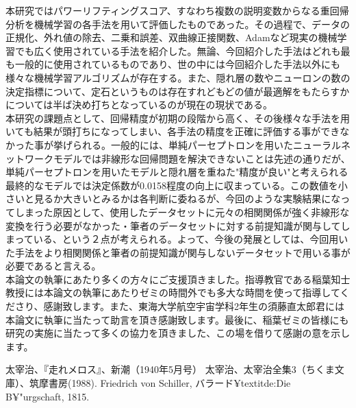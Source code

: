 \documentclass{report}
\begin{document}
本研究ではパワーリフティングスコア、すなわち複数の説明変数からなる重回帰分析を機械学習の各手法を用いて評価したものであった。その過程で、データの正規化、外れ値の除去、二乗和誤差、双曲線正接関数、Adamなど現実の機械学習でも広く使用されている手法を紹介した。無論、今回紹介した手法はどれも最も一般的に使用されているものであり、世の中には今回紹介した手法以外にも様々な機械学習アルゴリズムが存在する。また、隠れ層の数やニューロンの数の決定指標について、定石というものは存在すれどもどの値が最適解をもたらすかについては半ば決め打ちとなっているのが現在の現状である。
\\

本研究の課題点として、回帰精度が初期の段階から高く、その後様々な手法を用いても結果が頭打ちになってしまい、各手法の精度を正確に評価する事ができなかった事が挙げられる。一般的には、単純パーセプトロンを用いたニューラルネットワークモデルでは非線形な回帰問題を解決できないことは先述の通りだが、単純パーセプトロンを用いたモデルと隠れ層を重ねた"精度が良い"と考えられる最終的なモデルでは決定係数が0.0158程度の向上に収まっている。この数値を小さいと見るか大きいとみるかは各判断に委ねるが、今回のような実験結果になってしまった原因として、使用したデータセットに元々の相関関係が強く非線形な変換を行う必要がなかった・筆者のデータセットに対する前提知識が関与してしまっている、という２点が考えられる。よって、今後の発展としては、今回用いた手法をより相関関係と筆者の前提知識が関与しないデータセットで用いる事が必要であると言える。
\\


本論文の執筆にあたり多くの方々にご支援頂きました。指導教官である稲葉知士教授には本論文の執筆にあたりゼミの時間外でも多大な時間を使って指導してくださり、感謝致します。また、東海大学航空宇宙学科2年生の須藤直太郎君には本論文に執筆に当たって助言を頂き感謝致します。最後に、稲葉ゼミの皆様にも研究の実施に当たって多くの協力を頂きました、この場を借りて感謝の意を示します。

\newpage


\begin{thebibliography}{99}
 太宰治、『走れメロス』、新潮（1940年5月号）
 太宰治、太宰治全集3（ちくま文庫）、筑摩書房(1988).
 Friedrich von Schiller, バラード¥textit{de:Die B¥"{u}rgschaft}, 1815.
\end{thebibliography}





% 
% 
\end{document}
